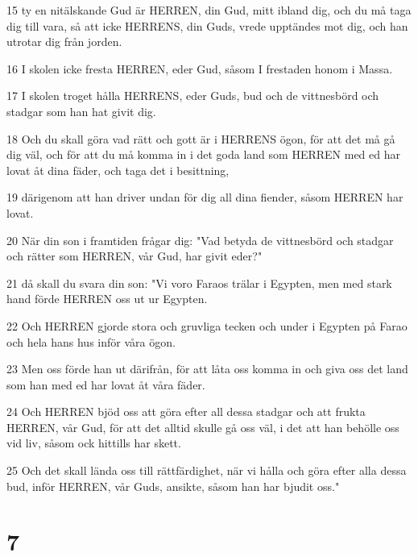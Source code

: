 \par 15 ty en nitälskande Gud är HERREN, din Gud, mitt ibland dig, och du må taga dig till vara, så att icke HERRENS, din Guds, vrede upptändes mot dig, och han utrotar dig från jorden.
\par 16 I skolen icke fresta HERREN, eder Gud, såsom I frestaden honom i Massa.
\par 17 I skolen troget hålla HERRENS, eder Guds, bud och de vittnesbörd och stadgar som han hat givit dig.
\par 18 Och du skall göra vad rätt och gott är i HERRENS ögon, för att det må gå dig väl, och för att du må komma in i det goda land som HERREN med ed har lovat åt dina fäder, och taga det i besittning,
\par 19 därigenom att han driver undan för dig all dina fiender, såsom HERREN har lovat.
\par 20 När din son i framtiden frågar dig: "Vad betyda de vittnesbörd och stadgar och rätter som HERREN, vår Gud, har givit eder?"
\par 21 då skall du svara din son: "Vi voro Faraos trälar i Egypten, men med stark hand förde HERREN oss ut ur Egypten.
\par 22 Och HERREN gjorde stora och gruvliga tecken och under i Egypten på Farao och hela hans hus inför våra ögon.
\par 23 Men oss förde han ut därifrån, för att låta oss komma in och giva oss det land som han med ed har lovat åt våra fäder.
\par 24 Och HERREN bjöd oss att göra efter all dessa stadgar och att frukta HERREN, vår Gud, för att det alltid skulle gå oss väl, i det att han behölle oss vid liv, såsom ock hittills har skett.
\par 25 Och det skall lända oss till rättfärdighet, när vi hålla och göra efter alla dessa bud, inför HERREN, vår Guds, ansikte, såsom han har bjudit oss."

\chapter{7}

